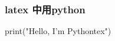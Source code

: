 
\begin{frame}
  \frametitle{ latex 中用python}
 \begin{pycode}
print("Hello, I'm Pythontex")
 \end{pycode}
\end{frame} 